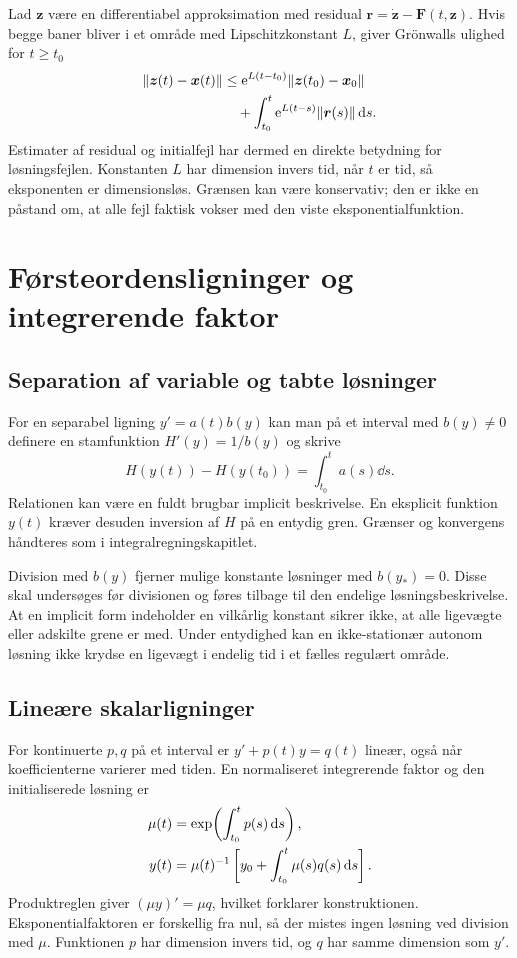 Lad $\boldsymbol{z}$ være en differentiabel approksimation med residual
$\boldsymbol{r}=\dot{\boldsymbol{z}}-\boldsymbol{F}(t,\boldsymbol{z})$.
Hvis begge baner bliver i et område med Lipschitzkonstant $L$, giver
Grönwalls ulighed for $t\ge t_0$
\begin{align}
 \|\boldsymbol{z}(t)-\boldsymbol{x}(t)\|
 &\le\mathrm{e}^{L(t-t_0)}\|\boldsymbol{z}(t_0)-\boldsymbol{x}_0\|\notag\\
 &\quad+\int_{t_0}^{t}\mathrm{e}^{L(t-s)}\|\boldsymbol{r}(s)\|\mathop{}\!\mathrm{d} s.
 \label{eq:ode-residual}
\end{align}
Estimater af residual og initialfejl har dermed en direkte betydning
for løsningsfejlen. Konstanten $L$ har dimension invers tid, når
$t$ er tid, så eksponenten er dimensionsløs. Grænsen kan være
konservativ; den er ikke en påstand om, at alle fejl faktisk vokser
med den viste eksponentialfunktion.

\section{Førsteordensligninger og integrerende faktor}
\label{sec:ode-foersteorden}
\subsection{Separation af variable og tabte løsninger}
For en separabel ligning $y'=a(t)b(y)$ kan man på et interval med
$b(y)\ne0$ definere en stamfunktion $H'(y)=1/b(y)$ og skrive
\[
 H(y(t))-H(y(t_0))=\int_{t_0}^{t}a(s)\dd s.
\]
Relationen kan være en fuldt brugbar implicit beskrivelse. En eksplicit
funktion $y(t)$ kræver desuden inversion af $H$ på en entydig gren.
Grænser og konvergens håndteres som i integralregningskapitlet.

Division med $b(y)$ fjerner mulige konstante løsninger med $b(y_*)=0$.
Disse skal undersøges før divisionen og føres tilbage til den endelige
løsningsbeskrivelse. At en implicit form indeholder en vilkårlig
konstant sikrer ikke, at alle ligevægte eller adskilte grene er med.
Under entydighed kan en ikke-stationær autonom løsning ikke krydse en
ligevægt i endelig tid i et fælles regulært område.



\subsection{Lineære skalarligninger}
For kontinuerte $p,q$ på et interval er
$y'+p(t)y=q(t)$ lineær, også når koefficienterne varierer med tiden.
En normaliseret integrerende faktor og den initialiserede løsning er
\begin{align}
 \mu(t)&=\exp\!\left(\int_{t_0}^t p(s)\mathop{}\!\mathrm{d} s\right),\notag\\
 y(t)&=\mu(t)^{-1}\left[y_0+
                    \int_{t_0}^t\mu(s)q(s)\mathop{}\!\mathrm{d} s\right].
 \label{eq:ode-lineaer-scalar}
\end{align}
Produktreglen giver $(\mu y)'=\mu q$, hvilket forklarer konstruktionen.
Eksponentialfaktoren er forskellig fra nul, så der mistes ingen løsning
ved division med $\mu$. Funktionen $p$ har dimension invers tid, og
$q$ har samme dimension som $y'$.

